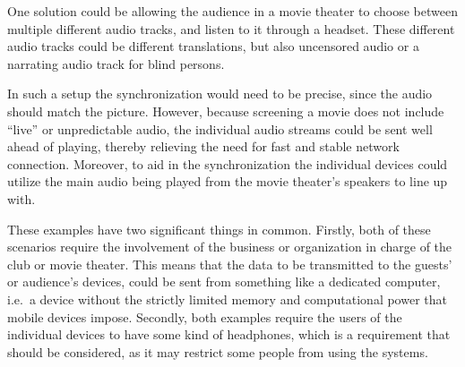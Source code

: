 \begin{description}
        One solution could be allowing the audience in a movie theater to choose between multiple different audio tracks, and listen to it through a headset.
        These different audio tracks could be different translations, but also uncensored audio or a narrating audio track for blind persons.

        In such a setup the synchronization would need to be precise, since the audio should match the picture.
        However, because screening a movie does not include \enquote{live} or unpredictable audio, the individual audio streams could be sent well ahead of playing,
        thereby relieving the need for fast and stable network connection.
        Moreover, to aid in the synchronization the individual devices could utilize the main audio being played from the movie theater's speakers to line up with.
\end{description}

These examples have two significant things in common.
Firstly, both of these scenarios require the involvement of the business or organization in charge of the club or movie theater.
This means that the data to be transmitted to the guests' or audience's devices, could be sent from something like a dedicated computer, i.e.~a device without the strictly limited memory and computational power that mobile devices impose.
Secondly, both examples require the users of the individual devices to have some kind of headphones, which is a requirement that should be considered, as it may restrict some people from using the systems.

